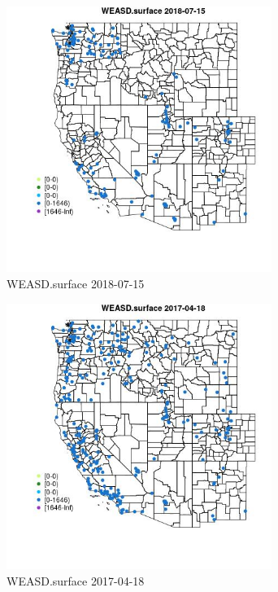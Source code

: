 \begin{figure} 
\centering  
\includegraphics[width=0.77\textwidth]{Code_Outputs/Report_ML_input_PM25_Step4_part_e_de_duplicated_aves_compiled_2019-05-20wNAs_MapObsWEASDsurface2018-07-15.jpg} 
\caption{\label{fig:Report_ML_input_PM25_Step4_part_e_de_duplicated_aves_compiled_2019-05-20wNAsMapObsWEASDsurface2018-07-15}WEASD.surface 2018-07-15} 
\end{figure} 
 

\clearpage 

\begin{figure} 
\centering  
\includegraphics[width=0.77\textwidth]{Code_Outputs/Report_ML_input_PM25_Step4_part_e_de_duplicated_aves_compiled_2019-05-20wNAs_MapObsWEASDsurface2017-04-18.jpg} 
\caption{\label{fig:Report_ML_input_PM25_Step4_part_e_de_duplicated_aves_compiled_2019-05-20wNAsMapObsWEASDsurface2017-04-18}WEASD.surface 2017-04-18} 
\end{figure} 
 

